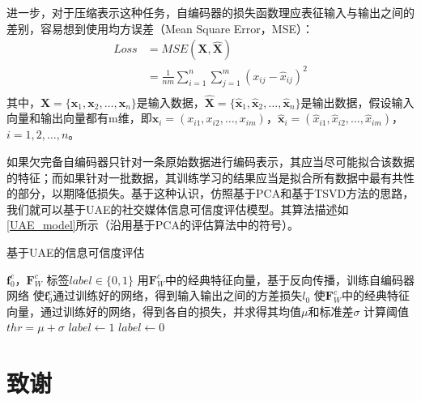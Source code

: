 \documentclass[a4paper,oneside,12pt]{book}
\begin{document}
进一步，对于压缩表示这种任务，自编码器的损失函数理应表征输入与输出之间的差别，容易想到使用均方误差（Mean Square Error，MSE）：
\begin{equation}
\begin{aligned}
Loss &= MSE(\bm{X},\hat{\bm{X}}) \\
         &= \frac{1}{nm}\sum_{i=1}^{n} \sum_{j=1}^{m} (x_{ij} -\hat{x}_{ij})^2 \\
\end{aligned}
\end{equation}
其中，$\bm{X}=\{\bm{x}_1,\bm{x}_2,\ldots,\bm{x}_n\}$是输入数据，$\hat{\bm{X}}=\{\hat{\bm{x}}_1,\hat{\bm{x}}_2,\ldots,\hat{\bm{x}}_n\}$是输出数据，假设输入向量和输出向量都有m维，即$\bm{x}_i = (x_{i1},x_{i2},\ldots,x_{im})$，$\hat{\bm{x}}_i = (\hat{x}_{i1},\hat{x}_{i2},\ldots,\hat{x}_{im})$，$i = 1,2,\ldots,n$。

如果欠完备自编码器只针对一条原始数据进行编码表示，其应当尽可能拟合该数据的特征；而如果针对一批数据，其训练学习的结果应当是拟合所有数据中最有共性的部分，以期降低损失。基于这种认识，仿照基于PCA和基于TSVD方法的思路，我们就可以基于UAE的社交媒体信息可信度评估模型。其算法描述如\ref{UAE_model}所示（沿用基于PCA的评估算法中的符号）。

\begin{algorithm} 
\caption{基于UAE的信息可信度评估} 
\label{UAE_model}
\renewcommand{\algorithmicrequire}{\textbf{输入：}}
\renewcommand{\algorithmicensure}{\textbf{输出：}} 
	\begin{algorithmic}[1] 
	\Require $\bm{f}^{c}_{0}$，$\bm{F}^{c}_{W}$
	\Ensure 标签$label\in \{0,1\}$
	\State 用$\bm{F}^{c}_{W}$中的经典特征向量，基于反向传播，训练自编码器网络
	\State  使$\bm{f}^{c}_{0}$通过训练好的网络，得到输入输出之间的方差损失$l_0$
	\State  使$\bm{F}^{c}_{W}$中的经典特征向量，通过训练好的网络，得到各自的损失，并求得其均值$\mu$和标准差$\sigma$
	\State 计算阈值$thr = {\mu} + {\sigma}$
		\State $ label \gets 1 $
	\Else
		\State $ label \gets 0 $
	\EndIf
	\end{algorithmic}
\end{algorithm}

\clearpage{}


\clearpage{}
\chapter*{致\qquad{}谢}
\normalsize\thankwords
\end{document}
